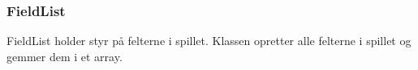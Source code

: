 \subsubsection{FieldList}
FieldList holder styr på felterne i spillet. Klassen opretter alle felterne i spillet og gemmer dem i et array. 